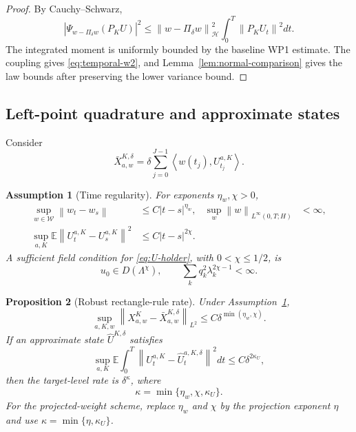 \documentclass[11pt]{article}
\newtheorem{assumption}{Assumption}[section]
\newtheorem{proposition}[assumption]{Proposition}
\theoremstyle{remark}
\newcommand{\E}{\mathbb E}
\newcommand{\cH}{\mathcal H}
\newcommand{\cW}{\mathcal W}
\newcommand{\norm}[1]{\left\lVert #1\right\rVert}
\newcommand{\ip}[2]{\left\langle #1,#2\right\rangle}
\newcommand{\Lam}{\Lambda}
\begin{document}
\begin{proof}
By Cauchy--Schwarz,
\[
 |\Psi_{w-\Pi_\delta w}(P_KU)|^2
 \le
 \norm{w-\Pi_\delta w}_{\cH}^2
 \int_0^T\norm{P_KU_t}^2dt.
\]
The integrated moment is uniformly bounded by the baseline WP1 estimate. The coupling gives \eqref{eq:temporal-w2}, and Lemma~\ref{lem:normal-comparison} gives the law bounds after preserving the lower variance bound.
\end{proof}

\subsection{Left-point quadrature and approximate states}

Consider
\begin{equation}\label{eq:left}
 \bar X_{a,w}^{K,\delta}
 =\delta\sum_{j=0}^{J-1}
 \ip{w(t_j)}{U_{t_j}^{a,K}}.
\end{equation}

\begin{assumption}[Time regularity]\label{ass:time-holder}
For exponents $\eta_w,\chi>0$,
\begin{align}
 \sup_{w\in\cW}\norm{w_t-w_s}
 &\le C|t-s|^{\eta_w},
 &\sup_w\norm{w}_{L^\infty(0,T;H)}&<\infty,
 \label{eq:w-holder}\\
 \sup_{a,K}\E\norm{U_t^{a,K}-U_s^{a,K}}^2
 &\le C|t-s|^{2\chi}.
 \label{eq:U-holder}
\end{align}
A sufficient field condition for \eqref{eq:U-holder}, with $0<\chi\le1/2$, is
\begin{equation}\label{eq:holder-sufficient}
 u_0\in D(\Lam^\chi),
 \qquad
 \sum_kq_k^2\lambda_k^{2\chi-1}<\infty.
\end{equation}
\end{assumption}

\begin{proposition}[Robust rectangle-rule rate]\label{prop:left}
Under Assumption~\ref{ass:time-holder},
\begin{equation}\label{eq:left-rate}
 \sup_{a,K,w}
 \norm{X_{a,w}^{K}-\bar X_{a,w}^{K,\delta}}_{L^2}
 \le C\delta^{\min(\eta_w,\chi)}.
\end{equation}
If an approximate state $\widehat U^{K,\delta}$ satisfies
\begin{equation}\label{eq:state-scheme}
 \sup_{a,K}\E\int_0^T
 \norm{U_t^{a,K}-\widehat U_t^{a,K,\delta}}^2dt
 \le C\delta^{2\kappa_U},
\end{equation}
then the target-level rate is $\delta^\kappa$, where
\begin{equation}\label{eq:kappa}
 \kappa=\min\{\eta_w,\chi,\kappa_U\}.
\end{equation}
For the projected-weight scheme, replace $\eta_w$ and $\chi$ by the projection exponent $\eta$ and use $\kappa=\min\{\eta,\kappa_U\}$.
\end{proposition}
\end{document}
